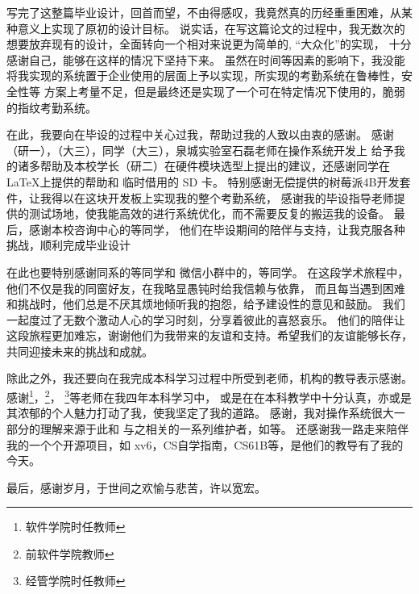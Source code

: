 
写完了这整篇毕业设计，回首而望，不由得感叹，我竟然真的历经重重困难，从某种意义上实现了原初的设计目标。
说实话，在写这篇论文的过程中，我无数次的想要放弃现有的设计，全面转向一个相对来说更为简单的, “大众化”的实现，
十分感谢自己，能够在这样的情况下坚持下来。
虽然在时间等因素的影响下，我没能将我实现的系统置于企业使用的层面上予以实现，所实现的考勤系统在鲁棒性，安全性等
方案上考量不足，但是最终还是实现了一个可在特定情况下使用的，脆弱的指纹考勤系统。

在此，我要向在毕设的过程中关心过我，帮助过我的人致以由衷的感谢。
感谢（研一），（大三），同学（大三），泉城实验室石磊老师在操作系统开发上
给予我的诸多帮助及本校学长（研二）在硬件模块选型上提出的建议，还感谢同学在 \LaTeX 上提供的帮助和  临时借用的 SD 卡。
特别感谢无偿提供的树莓派4B开发套件，让我得以在这块开发板上实现我的整个考勤系统，
感谢我的毕设指导老师提供的测试场地，使我能高效的进行系统优化，而不需要反复的搬运我的设备。
最后，感谢本校咨询中心的等同学，
他们在毕设期间的陪伴与支持，让我克服各种挑战，顺利完成毕业设计

在此也要特别感谢同系的等同学和
微信小群中的，等同学。
在这段学术旅程中，他们不仅是我的同窗好友，在我略显愚钝时给我信赖与依靠，
而且每当遇到困难和挑战时，他们总是不厌其烦地倾听我的抱怨，给予建设性的意见和鼓励。
我们一起度过了无数个激动人心的学习时刻，分享着彼此的喜怒哀乐。
他们的陪伴让这段旅程更加难忘，谢谢他们为我带来的友谊和支持。希望我们的友谊能够长存，共同迎接未来的挑战和成就。

除此之外，我还要向在我完成本科学习过程中所受到老师，机构的教导表示感谢。
感谢\footnote{软件学院时任教师}，\footnote{前软件学院教师}，
\footnote{经管学院时任教师}等老师在我四年本科学习中，
或是在在本科教学中十分认真，亦或是其浓郁的个人魅力打动了我，使我坚定了我的道路。
感谢，我对操作系统很大一部分的理解来源于此和
与之相关的一系列维护者，如等。
还感谢我一路走来陪伴我的一个个开源项目，如 xv6，CS自学指南，CS61B等，是他们的教导有了我的今天。

最后，感谢岁月，于世间之欢愉与悲苦，许以宽宏。


